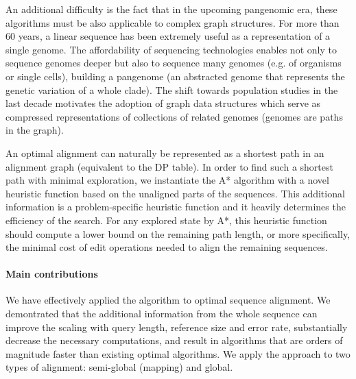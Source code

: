An additional difficulty is the fact that in the
upcoming pangenomic era, these algorithms must be also applicable to complex
graph structures. For more than 60 years, a linear sequence has been extremely
useful as a representation of a single genome. The affordability of sequencing
technologies enables not only to sequence genomes deeper but also to sequence
many genomes (e.g. of organisms or single cells), building a pangenome (an
abstracted genome that represents the genetic variation of a whole clade). The
shift towards population studies in the last decade motivates the adoption of
graph data structures which serve as compressed representations of collections
of related genomes (genomes are paths in the graph).

An optimal alignment can naturally be represented as a shortest path in an
alignment graph (equivalent to the DP table). In order to find such a shortest
path with minimal exploration, we instantiate the A* algorithm with a novel
heuristic function based on the unaligned parts of the sequences. This
additional information is a problem-specific heuristic function and it heavily
determines the efficiency of the search. For any explored state by A*, this
heuristic function should compute a lower bound on the remaining path length, or
more specifically, the minimal cost of edit operations needed to align the
remaining sequences.

\paragraph{Main contributions}
We have effectively applied the \A algorithm to optimal sequence alignment. We
demontrated that the additional information from the whole sequence can improve
the scaling with query length, reference size and error rate, substantially
decrease the necessary computations, and result in algorithms that are orders of
magnitude faster than existing optimal algorithms. We apply the \A approach to
two types of alignment: semi-global (mapping) and global.





